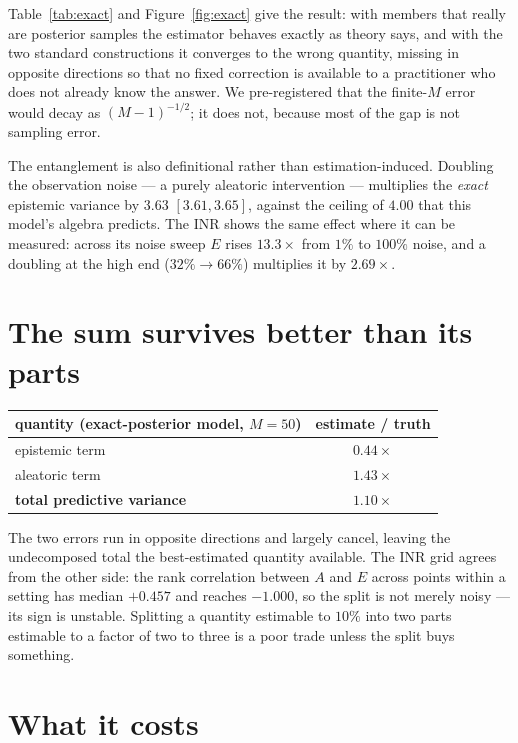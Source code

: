 \documentclass[10pt]{article}
\begin{document}
Table~\ref{tab:exact} and Figure~\ref{fig:exact} give the result: with members that really
are posterior samples the estimator behaves exactly as theory says, and with the two standard
constructions it converges to the wrong quantity, missing in opposite directions so that no
fixed correction is available to a practitioner who does not already know the answer. We
pre-registered that the finite-$M$ error would decay as $(M-1)^{-1/2}$; it does not, because
most of the gap is not sampling error.

The entanglement is also definitional rather than estimation-induced. Doubling the
observation noise --- a purely aleatoric intervention --- multiplies the \emph{exact}
epistemic variance by $3.63$ $[3.61, 3.65]$, against the ceiling of $4.00$ that this model's
algebra predicts. The INR shows the same effect where it can be measured: across its noise
sweep $E$ rises $13.3\times$ from $1\%$ to $100\%$ noise, and a doubling at the high end
($32\%\to66\%$) multiplies it by $2.69\times$.

\section{The sum survives better than its parts}
\label{sec:total}

\begin{center}
\small
\begin{tabular}{lc}
\toprule
quantity (exact-posterior model, $M=50$) & estimate / truth \\
\midrule
epistemic term & $0.44\times$ \\
aleatoric term & $1.43\times$ \\
\textbf{total predictive variance} & $\mathbf{1.10\times}$ \\
\bottomrule
\end{tabular}
\end{center}

The two errors run in opposite directions and largely cancel, leaving the undecomposed total
the best-estimated quantity available. The INR grid agrees from the other side: the rank
correlation between $A$ and $E$ across points within a setting has median $+0.457$ and
reaches $-1.000$, so the split is not merely noisy --- its sign is unstable. Splitting a
quantity estimable to $10\%$ into two parts estimable to a factor of two to three is a poor
trade unless the split buys something.

\section{What it costs}
\label{sec:cost}
\end{document}
